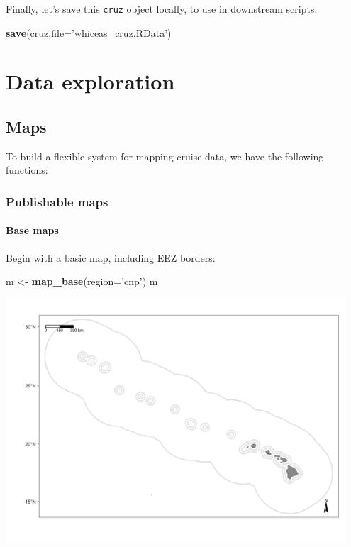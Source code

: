 \documentclass[
]{book}
\newenvironment{Shaded}{\begin{snugshade}}{\end{snugshade}}
\newcommand{\DataTypeTok}[1]{\textcolor[rgb]{0.13,0.29,0.53}{#1}}
\newcommand{\KeywordTok}[1]{\textcolor[rgb]{0.13,0.29,0.53}{\textbf{#1}}}
\newcommand{\NormalTok}[1]{#1}
\newcommand{\StringTok}[1]{\textcolor[rgb]{0.31,0.60,0.02}{#1}}
\begin{document}
Finally, let's save this \texttt{cruz} object locally, to use in downstream scripts:

\begin{Shaded}
\begin{Highlighting}[]
\KeywordTok{save}\NormalTok{(cruz,}\DataTypeTok{file=}\StringTok{'whiceas_cruz.RData'}\NormalTok{)}
\end{Highlighting}
\end{Shaded}

\hypertarget{part-data-exploration}{%
\part{Data exploration}\label{part-data-exploration}}

\hypertarget{maps}{%
\chapter{Maps}\label{maps}}

To build a flexible system for mapping cruise data, we have the following functions:

\hypertarget{publishable-maps}{%
\section*{Publishable maps}\label{publishable-maps}}

\hypertarget{base-maps}{%
\subsection*{Base maps}\label{base-maps}}

Begin with a basic map, including EEZ borders:

\begin{Shaded}
\begin{Highlighting}[]
\NormalTok{m <-}\StringTok{ }\KeywordTok{map_base}\NormalTok{(}\DataTypeTok{region=}\StringTok{'cnp'}\NormalTok{)}
\NormalTok{m}
\end{Highlighting}
\end{Shaded}

\includegraphics[width=0.95\textwidth,height=\textheight]{img/map_cnp.png}
\end{document}
